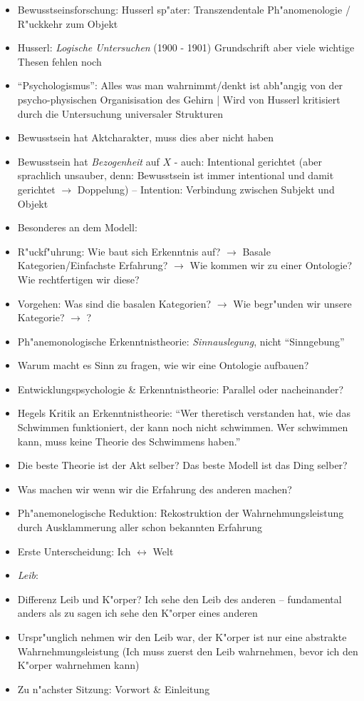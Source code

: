 \documentclass[emulatestandardclasses]{scrartcl}
\begin{document}
\begin{itemize}
  \item Bewusstseinsforschung: Husserl sp"ater: Transzendentale Ph"anomenologie / R"uckkehr zum Objekt
  \item Husserl: \emph{Logische Untersuchen} (1900 - 1901) Grundschrift aber viele wichtige Thesen fehlen noch
  \item "`Psychologismus"': Alles was man wahrnimmt/denkt ist abh"angig von der psycho-physischen Organisisation des Gehirn | Wird von Husserl kritisiert durch die Untersuchung universaler Strukturen
  \item Bewusstsein hat Aktcharakter, muss dies aber nicht haben
  \item Bewusstsein hat \emph{Bezogenheit} auf $X$ - auch: Intentional gerichtet (aber sprachlich unsauber, denn: Bewusstsein ist immer intentional und damit gerichtet $\rightarrow$ Doppelung) -- Intention: Verbindung zwischen Subjekt und Objekt
  \item Besonderes an dem Modell: 
  \item R"uckf"uhrung: Wie baut sich Erkenntnis auf? $\rightarrow$ Basale Kategorien/Einfachste Erfahrung? $\rightarrow$ Wie kommen wir zu einer Ontologie? Wie rechtfertigen wir diese?
  \item Vorgehen: Was sind die basalen Kategorien? $\rightarrow$ Wie begr"unden wir unsere Kategorie? $\rightarrow$ ?
  \item Ph"anemonologische Erkenntnistheorie: \emph{Sinnauslegung}, nicht "`Sinngebung"'
  \item Warum macht es Sinn zu fragen, wie wir eine Ontologie aufbauen?
  \item Entwicklungspsychologie \& Erkenntnistheorie: Parallel oder nacheinander?
  \item Hegels Kritik an Erkenntnistheorie: "`Wer theretisch verstanden hat, wie das Schwimmen funktioniert, der kann noch nicht schwimmen. Wer schwimmen kann, muss keine Theorie des Schwimmens haben."'
  \item Die beste Theorie ist der Akt selber? Das beste Modell ist das Ding selber?
  \item Was machen wir wenn wir die Erfahrung des anderen machen?
  \item Ph"anemonelogische Reduktion: Rekostruktion der Wahrnehmungsleistung durch Ausklammerung aller schon bekannten Erfahrung
  \item Erste Unterscheidung: Ich $\longleftrightarrow$ Welt
  \item \emph{Leib}: 
  \item Differenz Leib und K"orper? Ich sehe den Leib des anderen -- fundamental anders als zu sagen ich sehe den K"orper eines anderen
  \item Urspr"unglich nehmen wir den Leib war, der K"orper ist nur eine abstrakte Wahrnehmungsleistung (Ich muss zuerst den Leib wahrnehmen, bevor ich den K"orper wahrnehmen kann)
  \item Zu n"achster Sitzung: Vorwort \& Einleitung 
  
\end{itemize}
\end{document}
